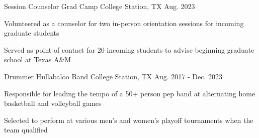 


\begin{cventries}

\cventry
{Session Counselor} %
{Grad Camp} %
{College Station, TX} %
{Aug. 2023} %
{ %
\begin{cvitems}
\item {Volunteered as a counselor for two in-person orientation sessions for incoming graduate students}
\item {Served as point of contact for 20 incoming students to advise beginning graduate school at Texas A\&M}
\end{cvitems}
}



\cventry
{Drummer} %
{Hullabaloo Band} %
{College Station, TX} %
{Aug. 2017 - Dec. 2023} %
{ %
\begin{cvitems}
\item {Responsible for leading the tempo of a 50+ person pep band at alternating home basketball and volleyball games}
\item {Selected to perform at various men's and women's playoff tournaments when the team qualified}
\end{cvitems}
}




\end{cventries}
